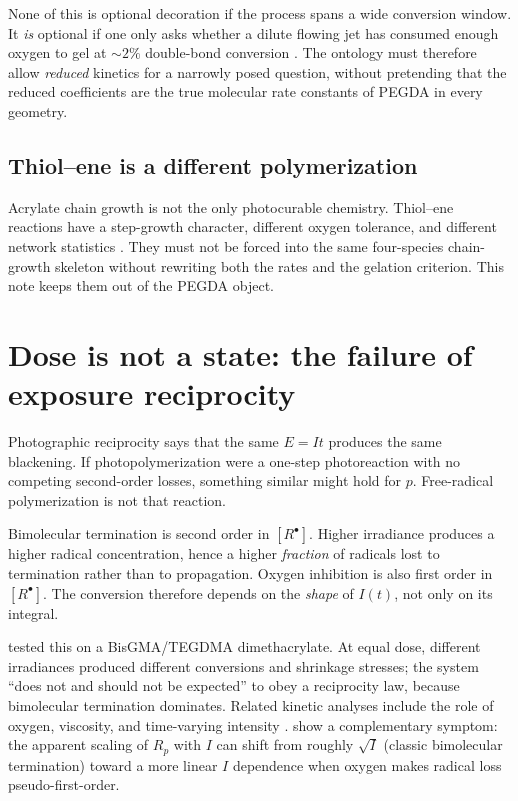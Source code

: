 None of this is optional decoration if the process spans a wide conversion window.
It \emph{is} optional if one only asks whether a dilute flowing jet has consumed enough oxygen to gel at $\sim 2\%$ double-bond conversion \citep{Slutzky2019}.
The ontology must therefore allow \emph{reduced} kinetics for a narrowly posed question, without pretending that the reduced coefficients are the true molecular rate constants of PEGDA in every geometry.

\subsection{Thiol--ene is a different polymerization}

Acrylate chain growth is not the only photocurable chemistry.
Thiol--ene reactions have a step-growth character, different oxygen tolerance, and different network statistics \citep{Cramer2001}.
They must not be forced into the same four-species chain-growth skeleton without rewriting both the rates and the gelation criterion.
This note keeps them out of the PEGDA object.

\section{\texorpdfstring{Dose is not a state: the failure of exposure reciprocity}{Dose is not a state: the failure of exposure reciprocity}}

Photographic reciprocity says that the same $E=It$ produces the same blackening.
If photopolymerization were a one-step photoreaction with no competing second-order losses, something similar might hold for $p$.
Free-radical polymerization is not that reaction.

Bimolecular termination is second order in $[R^\bullet]$.
Higher irradiance produces a higher radical concentration, hence a higher \emph{fraction} of radicals lost to termination rather than to propagation.
Oxygen inhibition is also first order in $[R^\bullet]$.
The conversion therefore depends on the \emph{shape} of $I(t)$, not only on its integral.

\citet{Wydra2014} tested this on a BisGMA/TEGDMA dimethacrylate.
At equal dose, different irradiances produced different conversions and shrinkage stresses; the system ``does not and should not be expected'' to obey a reciprocity law, because bimolecular termination dominates.
Related kinetic analyses include the role of oxygen, viscosity, and time-varying intensity \citep{Lin2019}.
\citet{Dobson2024} show a complementary symptom: the apparent scaling of $R_p$ with $I$ can shift from roughly $\sqrt{I}$ (classic bimolecular termination) toward a more linear $I$ dependence when oxygen makes radical loss pseudo-first-order.

